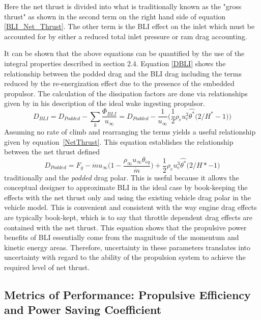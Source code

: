 Here the net thrust is divided into what is traditionally known as the "gross thrust" as shown in the second term on the right hand side of equation \ref{BLI_Net_Thrust}.  The other term is the BLI effect on the inlet which must be accounted for by either a reduced total inlet pressure or ram drag accounting.

It can be shown that the above equations can be quantified by the use of the integral properties described in section 2.4.  Equation \ref{DBLI} shows the relationship between the podded drag and the BLI drag including the terms reduced by the re-energization effect due to the presence of the embedded propulsor.  The calculation of the dissipation factors are done via relationships given by \cite{Drela2009} in his description of the ideal wake ingesting propulsor.  
    \begin{equation}D_{BLI} = D_{Podded}-\displaystyle\sum_{k}\frac{\Phi_{BLI}}{u_\infty} = D_{Podded} - \frac{1}{u_\infty}\Big(\frac{1}{2}\rho_e u_e^3 \hat{\theta^*}\Big(2/H^*-1\Big)\Big) \label{DBLI}\end{equation}
    Assuming no rate of climb and rearranging the terms yields a useful relationship given by equation~\ref{NetThrust}.  This equation establishes the relationship between the net thrust defined
    \begin{equation}D_{Podded} = F_g - \dot{m}u_\infty\Big(1-\frac{\rho_\infty u_\infty \theta_{eq}}{\dot{m}}\Big)+\frac{1}{2}\rho_e u_e^3 \hat{\theta^*}\Big(2/H*-1\Big)\label{NetThrust}\end{equation}
    traditionally and the \emph{podded} drag polar.  This is useful because it allows the conceptual designer to approximate BLI in the ideal case by book-keeping the effects with the net thrust only and using the existing vehicle drag polar in the vehicle model.  This is convenient and consistent with the way engine drag effects are typically book-kept, which is to say that throttle dependent drag effects are contained with the net thrust.  This equation shows that the propulsive power benefits of BLI essentially come from the magnitude of the momentum and kinetic energy areas.  Therefore, uncertainty in these parameters translates into uncertainty with regard to the ability of the propulsion system to achieve the required level of net thrust.

\subsection{Metrics of Performance:  Propulsive Efficiency and Power Saving Coefficient}


